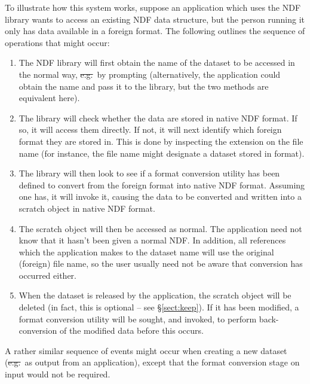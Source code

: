 To illustrate how this system works, suppose an application which uses
the NDF library wants to access an existing NDF data structure, but
the person running it only has data available in a foreign format.
The following outlines the sequence of operations that might occur:

\begin{enumerate}

\item The NDF library will first obtain the name of the dataset to be
accessed in the normal way, \st{e.g.}\ by prompting (alternatively,
the application could obtain the name and pass it to the library, but
the two methods are equivalent here).

\item The library will check whether the data are stored in native NDF
format.  If so, it will access them directly. If not, it will next
identify which foreign format they are stored in. This is done by
inspecting the extension on the file name (for instance, the file name
 might designate a dataset stored in
 format).

\item The library will then look to see if a format conversion utility
has been defined to convert from the foreign format into native NDF
format. Assuming one has, it will invoke it, causing the data to be
converted and written into a scratch object in native NDF format.

\item The scratch object will then be accessed as normal. The
application need not know that it hasn't been given a normal NDF.  In
addition, all references which the application makes to the dataset
name will use the original (foreign) file name, so the user usually
need not be aware that conversion has occurred either.

\item When the dataset is released by the application, the scratch
object will be deleted (in fact, this is optional -- see
\S\ref{sect:keep}). If it has been modified, a format conversion
utility will be sought, and invoked, to perform back-conversion of the
modified data before this occurs.

\end{enumerate}

A rather similar sequence of events might occur when creating a new
dataset (\st{e.g.}\ as output from an application), except that the
format conversion stage on input would not be required.

